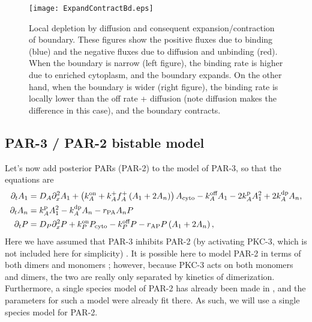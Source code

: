 \documentclass[11pt]{article}
\newcommand{\6}[1]{#1_{\text{6}}}
\newcommand{\3}[1]{#1_{\text{3}}}
\newcommand{\A}[1]{#1_A}
\begin{document}
\begin{figure}
\centering
\texttt{[image: ExpandContractBd.eps]}
\caption{\label{fig:ExpContrBd}Local depletion by diffusion and consequent expansion/contraction of boundary. These figures show the positive fluxes due to binding (blue) and the negative fluxes due to diffusion and unbinding (red). When the boundary is narrow (left figure), the binding rate is higher due to enriched cytoplasm, and the boundary expands. On the other hand, when the boundary is wider (right figure), the binding rate is locally lower than the off rate + diffusion (note diffusion makes the difference in this case), and the boundary contracts. }
\end{figure}

\subsection{PAR-3 / PAR-2 bistable model \label{sec:P2P3}}
Let's now add posterior PARs (PAR-2) to the model of PAR-3, so that the equations are 
\begin{subequations}
\label{eq:P32}
\begin{align}
\Dt A_1 &= D_A \Dx^2 A_1 +\left( \kon_A +\A{\kf}\A{f}^+\left(\MA+2\PA\right)\right) A_\text{cyto} - \koff_A \MA -2\kp_A \MA^2+2\kdp_A \PA,\\
\Dt \PA &= \kp_A \MA^2 - \kdp_A \PA-r_\text{PA} \PA P\\
\Dt P &= D_P \Dx^2 P + \kon_P P_\text{cyto} - \koff_P P -r_\text{AP} P\left(\MA+2\PA\right),%
\end{align}
\end{subequations}
Here we have assumed that PAR-3 inhibits PAR-2 (by activating PKC-3, which is not included here for simplicity) \cite{lang2017proteins}. It is possible here to model PAR-2 in terms of both dimers and monomers \cite{bland2023optimized}; however, because PKC-3 acts on both monomers and dimers, the two are really only separated by kinetics of dimerization. Furthermore, a single species model of PAR-2 has already been made in \cite{gross2019guiding}, and the parameters for such a model were already fit there. As such, we will use a single species model for PAR-2. 
\end{document}
